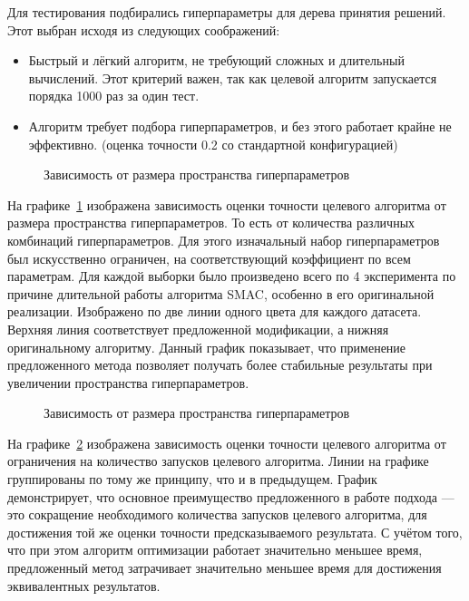 Для тестирования подбирались гиперпараметры для дерева принятия решений. Этот
выбран исходя из следующих соображений:

\begin{itemize}
    \item Быстрый и лёгкий алгоритм, не требующий сложных и длительный вычислений.
    Этот критерий важен, так как целевой алгоритм запускается порядка 1000 раз за один тест.
    \item Алгоритм требует подбора гиперпараметров, и без этого работает крайне
    не эффективно. (оценка точности 0.2 со стандартной конфигурацией)
\end{itemize}

\begin{figure}[!ht]
\caption{Зависимость от размера пространства гиперпараметров}\label{smac_size}
\end{figure}

На графике~\cref{smac_size} изображена зависимость оценки точности целевого
алгоритма от размера пространства гиперпараметров. То есть от количества
различных комбинаций гиперпараметров. Для этого изначальный набор
гиперпараметров был искусственно ограничен, на соответствующий коэффициент по
всем параметрам. Для каждой выборки было произведено всего по 4 эксперимента по
причине длительной работы алгоритма SMAC, особенно в его оригинальной
реализации. Изображено по две линии одного цвета для каждого датасета. Верхняя
линия соответствует предложенной модификации, а нижняя оригинальному алгоритму.
Данный график показывает, что применение предложенного метода позволяет получать
более стабильные результаты при увеличении пространства гиперпараметров.

\begin{figure}[!ht]
\caption{Зависимость от размера пространства гиперпараметров}\label{smac_count}
\end{figure}

На графике~\cref{smac_count} изображена зависимость оценки точности целевого
алгоритма от ограничения на количество запусков целевого алгоритма. Линии на
графике группированы по тому же принципу, что и в предыдущем. График
демонстрирует, что основное преимущество предложенного в работе подхода --- это
сокращение необходимого количества запусков целевого алгоритма, для достижения
той же оценки точности предсказываемого результата. С учётом того, что при этом
алгоритм оптимизации работает значительно меньшее время, предложенный метод
затрачивает значительно меньшее время для достижения эквивалентных результатов.


